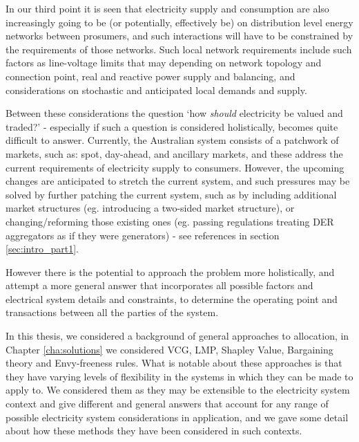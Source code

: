 In our third point it is seen that electricity supply and consumption are also increasingly going to be (or potentially, effectively be) on distribution level energy networks between prosumers, and such interactions will have to be constrained by the requirements of those networks. Such local network requirements include such factors as line-voltage limits that may depending on network topology and connection point, real and reactive power supply and balancing, and considerations on stochastic and anticipated local demands and supply.

Between these considerations the question `how \textit{should} electricity be valued and traded?' - especially if such a question is considered holistically, becomes quite difficult to answer.
Currently, the Australian system consists of a patchwork of markets, such as: spot, day-ahead, and ancillary markets, and these address the current requirements of electricity supply to consumers.
However, the upcoming changes are anticipated to stretch the current system, and such pressures may be solved by further patching the current system, such as by including additional market structures (eg. introducing a two-sided market structure), or changing/reforming those existing ones (eg. passing regulations treating DER aggregators as if they were generators) - see references in section \ref{sec:intro_part1}.

However there is the potential to approach the problem more holistically, and attempt a more general answer that incorporates all possible factors and electrical system details and constraints, to determine the operating point and transactions between all the parties of the system.

In this thesis, we considered a background of general approaches to allocation, in Chapter \ref{cha:solutions} we considered VCG, LMP, Shapley Value, Bargaining theory and Envy-freeness rules.
What is notable about these approaches is that they have varying levels of flexibility in the systems in which they can be made to apply to.
We considered them as they may be extensible to the electricity system context and give different and general answers that account for any range of possible electricity system considerations in application, and we gave some detail about how these methods they have been considered in such contexts.

